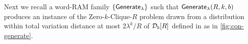 Next we recall a word-RAM family $\{{\mathsf{Generate}}_\lambda\}$ such that ${\mathsf{Generate}}_\lambda(R, k, b)$ produces an instance of the Zero-$k$-Clique-$R$ problem drawn from a distribution within total variation distance at most $2\lambda^{k}/R$ of $\mathcal{D}_{b}[R]$ defined in \cite{C:LaVLinWil19} as in \cref{fig:con-generate}.
